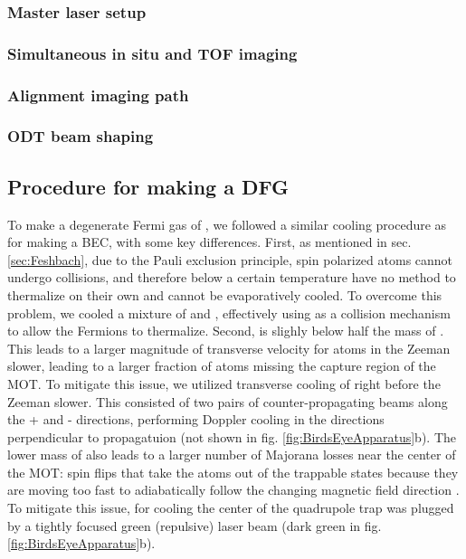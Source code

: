 \subsubsection{Master laser setup}

\subsubsection{Simultaneous in situ and TOF imaging}

\subsubsection{Alignment imaging path}

\subsubsection{ODT beam shaping}

\subsection{Procedure for making a DFG}\label{sec:DFGsequence}

To make a degenerate Fermi gas of \K{}, we followed a similar cooling procedure as for making a BEC, with some key differences. First, as mentioned in sec. \ref{sec:Feshbach}, due to the Pauli exclusion principle, spin polarized \K{} atoms cannot undergo \swave collisions, and therefore below a certain temperature have no method to thermalize on their own and cannot be evaporatively cooled. To overcome this problem, we cooled a mixture of \Rb{} and \K{}, effectively using \Rb{} as a collision mechanism to allow the Fermions to thermalize. Second, \K{} is slighly below half the mass of \Rb. This leads to a larger magnitude of transverse velocity for \K{} atoms in the Zeeman slower, leading to a larger fraction of atoms missing the capture region of the MOT. To mitigate this issue, we utilized transverse cooling of \K right before the Zeeman slower. This consisted of two pairs of counter-propagating beams along the \ez{}+\ey{} and \ez{}-\ey{} directions, performing Doppler cooling in the directions perpendicular to propagatuion (not shown in fig. \ref{fig:BirdsEyeApparatus}b). The lower mass of \K{} also leads to a larger number of Majorana losses near the center of the MOT: spin flips that take the atoms out of the trappable states because they are moving too fast to adiabatically follow the changing magnetic field direction \cite{Majorana1932,Sukumar1997, Brink2006}. To mitigate this issue, for cooling \K the center of the quadrupole trap was plugged by a tightly focused green (repulsive) laser beam (dark green in fig. \ref{fig:BirdsEyeApparatus}b).

